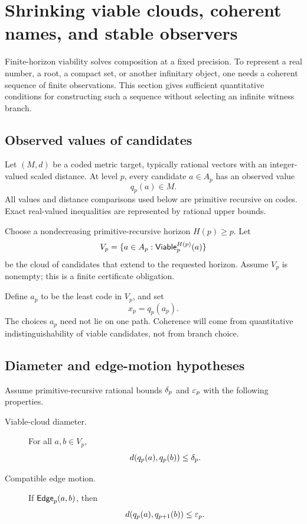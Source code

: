 \section{Shrinking viable clouds, coherent names, and stable observers}
\label{sec:shrinking}

Finite-horizon viability solves composition at a fixed precision.  To represent a real number, a root, a compact set, or another infinitary object, one needs a coherent sequence of finite observations.  This section gives sufficient quantitative conditions for constructing such a sequence without selecting an infinite witness branch.

\subsection{Observed values of candidates}

Let \((M,d)\) be a coded metric target, typically rational vectors with an integer-valued scaled distance.  At level \(p\), every candidate \(a\in A_p\) has an observed value
\[
 q_p(a)\in M.
\]
All values and distance comparisons used below are primitive recursive on codes.  Exact real-valued inequalities are represented by rational upper bounds.

Choose a nondecreasing primitive-recursive horizon \(H(p)\ge p\).  Let
\[
 V_p=\{a\in A_p:\mathsf{Viable}_p^{H(p)}(a)\}
\]
be the cloud of candidates that extend to the requested horizon.  Assume \(V_p\) is nonempty; this is a finite certificate obligation.

Define \(a_p\) to be the least code in \(V_p\), and set
\[
 x_p=q_p(a_p).
\]
The choices \(a_p\) need not lie on one path.  Coherence will come from quantitative indistinguishability of viable candidates, not from branch choice.

\subsection{Diameter and edge-motion hypotheses}

Assume primitive-recursive rational bounds \(\delta_p\) and \(\varepsilon_p\) with the following properties.

\begin{description}
\item[Viable-cloud diameter.] For all \(a,b\in V_p\),
\[
 d(q_p(a),q_p(b))\le \delta_p.
\]
\item[Compatible edge motion.] If \(\mathsf{Edge}_p(a,b)\), then
\[
 d(q_p(a),q_{p+1}(b))\le \varepsilon_p.
\]
\end{description}

